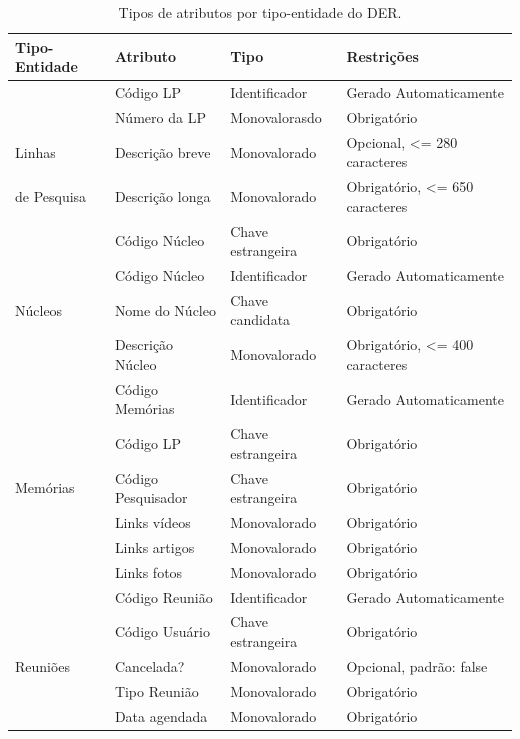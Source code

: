 \documentclass[11pt]{../../classes/ifscarticle}
\begin{document}
\begin{table}[h]
    \centering
    \vspace{0.5cm}
    \begin{tabular}{ |p{}|p{3cm}|p{4cm}|p{}|  }
      \hline
      Tipo-Entidade & Atributo & Tipo & Restrições \\ %
     
                                             
      \hline
                    & Código LP       & Identificador     & Gerado Automaticamente         \\
                    & Número da LP    & Monovalorasdo      & Obrigatório                    \\
     Linhas        & Descrição breve & Monovalorado      & Opcional, <= 280 caracteres    \\
     de Pesquisa    & Descrição longa & Monovalorado      & Obrigatório, <= 650 caracteres \\
                    & Código Núcleo   & Chave estrangeira & Obrigatório                    \\
      \hline
                    & Código Núcleo       & Identificador     & Gerado Automaticamente         \\
      Núcleos       & Nome do Núcleo      & Chave candidata   & Obrigatório                    \\
                    & Descrição Núcleo & Monovalorado      & Obrigatório, <= 400 caracteres \\
      \hline
                    & Código Memórias     & Identificador     & Gerado Automaticamente \\
                    & Código LP           & Chave estrangeira & Obrigatório            \\
      Memórias      & Código \linebreak Pesquisador  & Chave estrangeira & Obrigatório            \\
                    & Links vídeos        & Monovalorado      & Obrigatório            \\
                    & Links artigos       & Monovalorado      & Obrigatório            \\
                    & Links fotos         & Monovalorado      & Obrigatório            \\
      \hline 
                    & Código Reunião      & Identificador     & Gerado Automaticamente  \\
                    & Código Usuário      & Chave estrangeira & Obrigatório             \\
     Reuniões       & Cancelada?          & Monovalorado      & Opcional, padrão: false \\
                    & Tipo Reunião        & Monovalorado      & Obrigatório             \\
                    & Data agendada       & Monovalorado      & Obrigatório             \\
      \hline
    \end{tabular}
    \caption{Tipos de atributos por tipo-entidade do DER.}
  \end{table}
\end{document}
